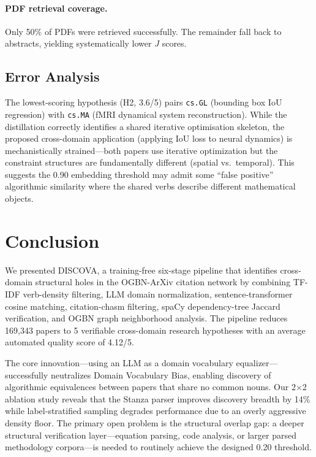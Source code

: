\documentclass[11pt]{article}
\begin{document}
\paragraph{PDF retrieval coverage.}
Only 50\% of PDFs were retrieved successfully. The remainder fall back to
abstracts, yielding systematically lower $J$ scores.

\subsection{Error Analysis}

The lowest-scoring hypothesis (H2, 3.6/5) pairs \texttt{cs.GL}
(bounding box IoU regression) with \texttt{cs.MA} (fMRI dynamical system
reconstruction). While the distillation correctly identifies a shared
iterative optimisation skeleton, the proposed cross-domain application
(applying IoU loss to neural dynamics) is mechanistically strained---both
papers use iterative optimization but the constraint structures are
fundamentally different (spatial vs.\ temporal). This suggests the
0.90 embedding threshold may admit some ``false positive'' algorithmic
similarity where the shared verbs describe different mathematical objects.

\section{Conclusion}

We presented DISCOVA, a training-free six-stage pipeline that identifies
cross-domain structural holes in the OGBN-ArXiv citation network by
combining TF-IDF verb-density filtering, LLM domain normalization,
sentence-transformer cosine matching, citation-chasm filtering, spaCy
dependency-tree Jaccard verification, and OGBN graph neighborhood analysis.
The pipeline reduces 169,343 papers to 5 verifiable cross-domain research
hypotheses with an average automated quality score of 4.12/5.

The core innovation---using an LLM as a domain vocabulary equalizer---
successfully neutralizes Domain Vocabulary Bias, enabling discovery of
algorithmic equivalences between papers that share no common nouns.
Our 2$\times$2 ablation study reveals that the Stanza parser improves
discovery breadth by 14\% while label-stratified sampling degrades
performance due to an overly aggressive density floor. The primary open
problem is the structural overlap gap: a deeper structural verification
layer---equation parsing, code analysis, or larger parsed methodology
corpora---is needed to routinely achieve the designed 0.20 threshold.
\end{document}
